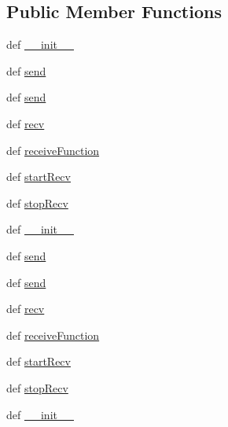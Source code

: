 \subsection*{Public Member Functions}
\begin{DoxyCompactItemize}
\item 
def \hyperlink{classnetwork_1_1commsChannel_1_1UDPChannel_ae3e90f5c66765ae3f5d97334bb9767ad}{\+\_\+\+\_\+init\+\_\+\+\_\+}
\item 
def \hyperlink{classnetwork_1_1commsChannel_1_1UDPChannel_a7aeb7a38b3072fab11df4881fb22dd67}{send}
\item 
def \hyperlink{classnetwork_1_1commsChannel_1_1UDPChannel_a7aeb7a38b3072fab11df4881fb22dd67}{send}
\item 
def \hyperlink{classnetwork_1_1commsChannel_1_1UDPChannel_aeeda07b7e78ec0750501ca40d114aadc}{recv}
\item 
def \hyperlink{classnetwork_1_1commsChannel_1_1UDPChannel_a0e4df6f6b2e9030f6b58a945ab15e71d}{receive\+Function}
\item 
def \hyperlink{classnetwork_1_1commsChannel_1_1UDPChannel_a1a31b8bce874232ee25a022fe8a358dc}{start\+Recv}
\item 
def \hyperlink{classnetwork_1_1commsChannel_1_1UDPChannel_aa3eb1e0f39dbf4a9fed075600b104772}{stop\+Recv}
\item 
def \hyperlink{classnetwork_1_1commsChannel_1_1UDPChannel_ae3e90f5c66765ae3f5d97334bb9767ad}{\+\_\+\+\_\+init\+\_\+\+\_\+}
\item 
def \hyperlink{classnetwork_1_1commsChannel_1_1UDPChannel_a7aeb7a38b3072fab11df4881fb22dd67}{send}
\item 
def \hyperlink{classnetwork_1_1commsChannel_1_1UDPChannel_a7aeb7a38b3072fab11df4881fb22dd67}{send}
\item 
def \hyperlink{classnetwork_1_1commsChannel_1_1UDPChannel_aeeda07b7e78ec0750501ca40d114aadc}{recv}
\item 
def \hyperlink{classnetwork_1_1commsChannel_1_1UDPChannel_a0e4df6f6b2e9030f6b58a945ab15e71d}{receive\+Function}
\item 
def \hyperlink{classnetwork_1_1commsChannel_1_1UDPChannel_a1a31b8bce874232ee25a022fe8a358dc}{start\+Recv}
\item 
def \hyperlink{classnetwork_1_1commsChannel_1_1UDPChannel_aa3eb1e0f39dbf4a9fed075600b104772}{stop\+Recv}
\item 
def \hyperlink{classnetwork_1_1commsChannel_1_1UDPChannel_ae3e90f5c66765ae3f5d97334bb9767ad}{\+\_\+\+\_\+init\+\_\+\+\_\+}
\item 

\end{DoxyCompactItemize}
